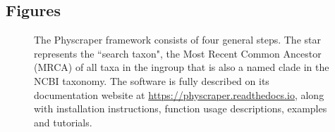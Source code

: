 \documentclass{bmcart}
\begin{document}
\begin{backmatter}





\section*{Figures}
  \begin{figure}[h!]
  \caption{The Physcraper framework consists of four general steps. The star represents
  the ``search taxon", the Most Recent Common Ancestor (MRCA) of all taxa in the
  ingroup that is also a named clade in the NCBI taxonomy. The software is fully
  described on its documentation website at \href{https://physcraper.readthedocs.io}{https://physcraper.readthedocs.io},
  along with installation instructions, function usage descriptions, examples and tutorials.
}
\end{figure}


\end{backmatter}
\end{document}
